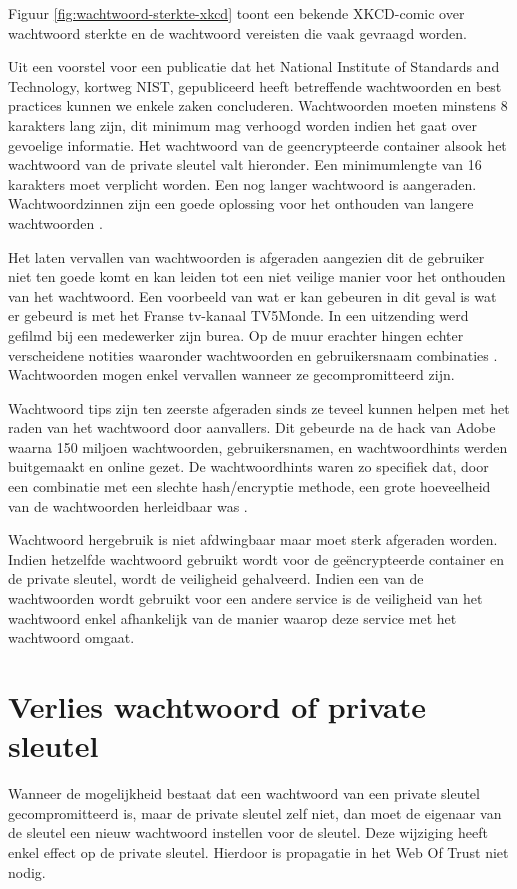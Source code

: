 Figuur \ref{fig:wachtwoord-sterkte-xkcd} toont een bekende XKCD-comic over
wachtwoord sterkte en de wachtwoord vereisten die vaak gevraagd worden.

Uit een voorstel voor een publicatie dat het National Institute of Standards and
Technology, kortweg NIST, gepubliceerd heeft betreffende wachtwoorden en best
practices kunnen we enkele zaken concluderen. Wachtwoorden moeten minstens 8
karakters lang zijn, dit minimum mag verhoogd worden indien het gaat over
gevoelige informatie. Het wachtwoord van de geencrypteerde container alsook het
wachtwoord van de private sleutel valt hieronder. Een minimumlengte van 16
karakters moet verplicht worden. Een nog langer wachtwoord is aangeraden.
Wachtwoordzinnen zijn een goede oplossing voor het onthouden van langere
wachtwoorden \autocite{NISTDigitalIdentityGuidelines}.

Het laten vervallen van wachtwoorden is afgeraden aangezien dit de gebruiker
niet ten goede komt en kan leiden tot een niet veilige manier voor het onthouden
van het wachtwoord. Een voorbeeld van wat er kan gebeuren in dit geval is wat er
gebeurd is met het Franse tv-kanaal TV5Monde. In een uitzending werd gefilmd bij
een medewerker zijn burea. Op de muur erachter hingen echter verscheidene
notities waaronder wachtwoorden en gebruikersnaam combinaties
\autocite{MachkovechMonde}. Wachtwoorden mogen enkel vervallen wanneer ze
gecompromitteerd zijn.

Wachtwoord tips zijn ten zeerste afgeraden sinds ze teveel kunnen helpen met het
raden van het wachtwoord door aanvallers. Dit gebeurde na de hack van Adobe
waarna 150 miljoen wachtwoorden, gebruikersnamen, en wachtwoordhints werden
buitgemaakt en online gezet. De wachtwoordhints waren zo specifiek dat, door een
combinatie met een slechte hash/encryptie methode, een grote hoeveelheid van de
wachtwoorden herleidbaar was \autocite{HernGuardianAdobeLeak}.

Wachtwoord hergebruik is niet afdwingbaar maar moet sterk afgeraden worden.
Indien hetzelfde wachtwoord gebruikt wordt voor de geëncrypteerde container en
de private sleutel, wordt de veiligheid gehalveerd. Indien een van de
wachtwoorden wordt gebruikt voor een andere service is de veiligheid van het
wachtwoord enkel afhankelijk van de manier waarop deze service met het
wachtwoord omgaat.

\section{Verlies wachtwoord of private sleutel}
\label{sec:verlies-wachtwoord-of-private-sleutel}
Wanneer de mogelijkheid bestaat dat een wachtwoord van een private sleutel
gecompromitteerd is, maar de private sleutel zelf niet, dan moet de eigenaar van
de sleutel een nieuw wachtwoord instellen voor de sleutel. Deze wijziging heeft
enkel effect op de private sleutel. Hierdoor is propagatie in het Web Of Trust
niet nodig.

